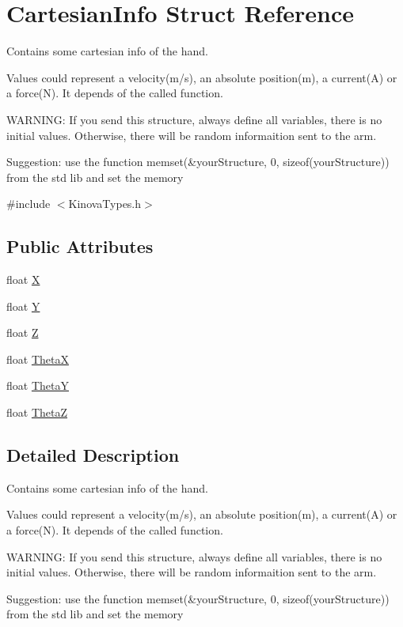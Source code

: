 \hypertarget{struct_cartesian_info}{\section{Cartesian\-Info Struct Reference}
\label{struct_cartesian_info}
}


\par
Contains some cartesian info of the hand. \par
Values could represent a velocity(m/s), an absolute position(m), a current(\-A) or a force(\-N). It depends of the called function. \par
W\-A\-R\-N\-I\-N\-G\-: If you send this structure, always define all variables, there is no initial values. Otherwise, there will be random informaition sent to the arm. \par
Suggestion\-: use the function memset(\&your\-Structure, 0, sizeof(your\-Structure)) from the std lib and set the memory  




{\ttfamily \#include $<$Kinova\-Types.\-h$>$}

\subsection*{Public Attributes}
\begin{DoxyCompactItemize}
\item 
float \hyperlink{struct_cartesian_info_a212cc2dcae1697132fc31fa2f5d17269}{X}
\item 
float \hyperlink{struct_cartesian_info_a12c2611c89445419b336e58815d87c7c}{Y}
\item 
float \hyperlink{struct_cartesian_info_a14e196e4cb38c0ae7f4658b9b070b7fe}{Z}
\item 
float \hyperlink{struct_cartesian_info_a39135e53155aa4025c40eeefbfd3b17c}{Theta\-X}
\item 
float \hyperlink{struct_cartesian_info_a4aef5897f4cdcf7ecc9df6804f844d46}{Theta\-Y}
\item 
float \hyperlink{struct_cartesian_info_a2890c501f3b7b9479e12ad51f04f0a7f}{Theta\-Z}
\end{DoxyCompactItemize}


\subsection{Detailed Description}
\par
Contains some cartesian info of the hand. \par
Values could represent a velocity(m/s), an absolute position(m), a current(\-A) or a force(\-N). It depends of the called function. \par
W\-A\-R\-N\-I\-N\-G\-: If you send this structure, always define all variables, there is no initial values. Otherwise, there will be random informaition sent to the arm. \par
Suggestion\-: use the function memset(\&your\-Structure, 0, sizeof(your\-Structure)) from the std lib and set the memory 



